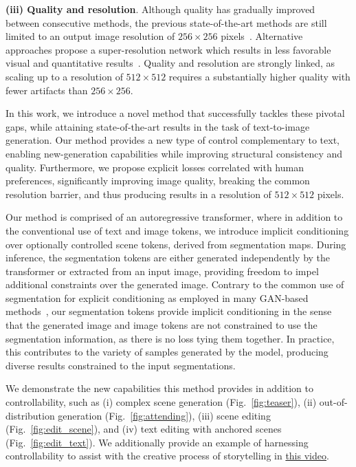\documentclass[final]{cvpr}
\begin{document}
{\textbf{(iii) Quality and resolution}}. Although quality has gradually improved between consecutive methods, the previous state-of-the-art methods are still limited to an output image resolution of $256\times256$ pixels~\cite{ramesh2021zero,nichol2021glide}. Alternative approaches propose a super-resolution network which results in less favorable visual and quantitative results~\cite{ding2021cogview}. Quality and resolution are strongly linked, as scaling up to a resolution of $512\times512$ requires a substantially higher quality with fewer artifacts than $256\times256$.

In this work, we introduce a novel method that successfully tackles these pivotal gaps, while attaining state-of-the-art results in the task of text-to-image generation. Our method provides a new type of control complementary to text, enabling new-generation capabilities while improving structural consistency and quality. Furthermore, we propose explicit losses correlated with human preferences, significantly improving image quality, breaking the common resolution barrier, and thus producing results in a resolution of $512\times512$ pixels.

Our method is comprised of an autoregressive transformer, where in addition to the conventional use of text and image tokens, we introduce implicit conditioning over optionally controlled scene tokens, derived from segmentation maps. During inference, the segmentation tokens are either generated independently by the transformer or extracted from an input image, providing freedom to impel additional constraints over the generated image.
Contrary to the common use of segmentation for explicit conditioning as employed in many GAN-based methods~\cite{isola2017image,wang2018high,park2019semantic}, our segmentation tokens provide implicit conditioning in the sense that the generated image and image tokens are not constrained to use the segmentation information, as there is no loss tying them together. In practice, this contributes to the variety of samples generated by the model, producing diverse results constrained to the input segmentations.

We demonstrate the new capabilities this method provides in addition to controllability, such as (i) complex scene generation (Fig.~\ref{fig:teaser}), (ii) out-of-distribution generation (Fig.~\ref{fig:attending}), (iii) scene editing (Fig.~\ref{fig:edit_scene}), and (iv) text editing with anchored scenes (Fig.~\ref{fig:edit_text}). We additionally provide an example of harnessing controllability to assist with the creative process of storytelling in \href{https://youtu.be/QLTyqoJJKTo}{this video}.
\end{document}
